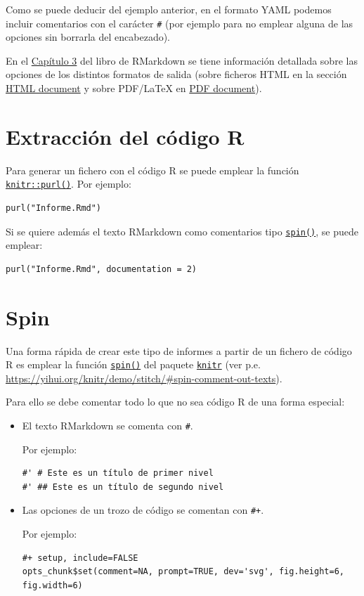 \documentclass[
]{book}
\theoremstyle{break}
\theoremstyle{nonumberplain}
\begin{document}
Como se puede deducir del ejemplo anterior, en el formato YAML podemos incluir comentarios con el carácter \texttt{\#}
(por ejemplo para no emplear alguna de las opciones sin borrarla del encabezado).

En el \href{https://bookdown.org/yihui/rmarkdown/documents.html}{Capítulo 3} del libro de RMarkdown se tiene información detallada sobre las opciones de los distintos formatos de salida (sobre ficheros HTML en la sección \href{https://bookdown.org/yihui/rmarkdown/html-document.html}{HTML document} y sobre PDF/LaTeX en \href{https://bookdown.org/yihui/rmarkdown/pdf-document.html}{PDF document}).

\section{Extracción del código R}\label{extracciuxf3n-del-cuxf3digo-r}

Para generar un fichero con el código R se puede emplear la función \href{https://rdrr.io/pkg/knitr/man/knit.html}{\texttt{knitr::purl()}}.
Por ejemplo:

\begin{verbatim}
purl("Informe.Rmd")
\end{verbatim}

Si se quiere además el texto RMarkdown como comentarios tipo \href{https://rdrr.io/pkg/knitr/man/spin.html}{\texttt{spin()}}, se puede emplear:

\begin{verbatim}
purl("Informe.Rmd", documentation = 2)
\end{verbatim}

\section{Spin}\label{spin}

Una forma rápida de crear este tipo de informes a partir de un fichero de código R es emplear la función \href{https://rdrr.io/pkg/knitr/man/spin.html}{\texttt{spin()}} del paquete \href{https://yihui.org/knitr/}{\texttt{knitr}} (ver p.e. \url{https://yihui.org/knitr/demo/stitch/\#spin-comment-out-texts}).

Para ello se debe comentar todo lo que no sea código R de una forma especial:

\begin{itemize}
\item
  El texto RMarkdown se comenta con \texttt{\#\textquotesingle{}}.

  Por ejemplo:

\begin{verbatim}
#' # Este es un título de primer nivel
#' ## Este es un título de segundo nivel
\end{verbatim}
\item
  Las opciones de un trozo de código se comentan con \texttt{\#+}.

  Por ejemplo:

\begin{verbatim}
#+ setup, include=FALSE
opts_chunk$set(comment=NA, prompt=TRUE, dev='svg', fig.height=6, fig.width=6)
\end{verbatim}
\end{itemize}
\end{document}
